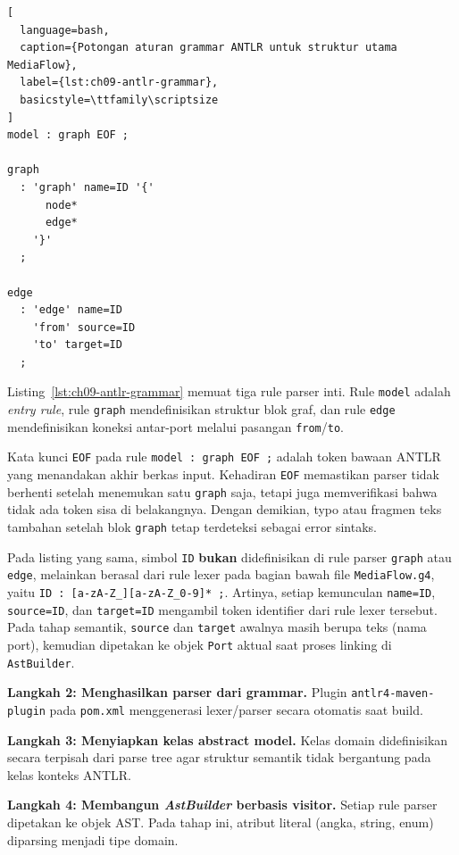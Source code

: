 \begin{lstlisting}[
  language=bash,
  caption={Potongan aturan grammar ANTLR untuk struktur utama MediaFlow},
  label={lst:ch09-antlr-grammar},
  basicstyle=\ttfamily\scriptsize
]
model : graph EOF ;

graph
  : 'graph' name=ID '{'
      node*
      edge*
    '}'
  ;

edge
  : 'edge' name=ID
    'from' source=ID
    'to' target=ID
  ;
\end{lstlisting}

\noindent Listing~\ref{lst:ch09-antlr-grammar} memuat tiga rule parser inti. Rule \texttt{model} adalah \textit{entry rule}, rule \texttt{graph} mendefinisikan struktur blok graf, dan rule \texttt{edge} mendefinisikan koneksi antar-port melalui pasangan \texttt{from}/\texttt{to}.

\noindent Kata kunci \texttt{EOF} pada rule \texttt{model : graph EOF ;} adalah token bawaan ANTLR yang menandakan akhir berkas input. Kehadiran \texttt{EOF} memastikan parser tidak berhenti setelah menemukan satu \texttt{graph} saja, tetapi juga memverifikasi bahwa tidak ada token sisa di belakangnya. Dengan demikian, typo atau fragmen teks tambahan setelah blok \texttt{graph} tetap terdeteksi sebagai error sintaks.

\noindent Pada listing yang sama, simbol \texttt{ID} \textbf{bukan} didefinisikan di rule parser \texttt{graph} atau \texttt{edge}, melainkan berasal dari rule lexer pada bagian bawah file \texttt{MediaFlow.g4}, yaitu \texttt{ID : [a-zA-Z\_][a-zA-Z\_0-9]* ;}. Artinya, setiap kemunculan \texttt{name=ID}, \texttt{source=ID}, dan \texttt{target=ID} mengambil token identifier dari rule lexer tersebut. Pada tahap semantik, \texttt{source} dan \texttt{target} awalnya masih berupa teks (nama port), kemudian dipetakan ke objek \texttt{Port} aktual saat proses linking di \texttt{AstBuilder}.

\textbf{Langkah 2: Menghasilkan parser dari grammar.} Plugin \texttt{antlr4-maven-plugin} pada \texttt{pom.xml} menggenerasi lexer/parser secara otomatis saat build.

\textbf{Langkah 3: Menyiapkan kelas abstract model.} Kelas domain didefinisikan secara terpisah dari parse tree agar struktur semantik tidak bergantung pada kelas konteks ANTLR.

\textbf{Langkah 4: Membangun \textit{AstBuilder} berbasis visitor.} Setiap rule parser dipetakan ke objek AST. Pada tahap ini, atribut literal (angka, string, enum) diparsing menjadi tipe domain.

